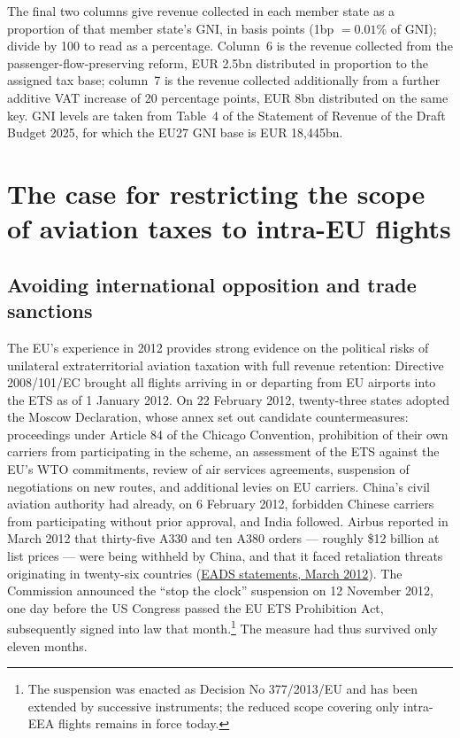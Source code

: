 \documentclass{article}
\begin{document}
\begin{table}[htbp]
\begin{minipage}{\textwidth}
The final two columns give revenue collected in each member state as a
proportion of that member state's GNI, in basis points (1bp $=0.01\%$ of GNI);
divide by 100 to read as a percentage. Column~6 is the revenue collected from
the passenger-flow-preserving reform, EUR 2.5bn distributed in proportion to
the assigned tax base; column~7 is the revenue collected additionally from a
further additive VAT increase of 20 percentage points, EUR 8bn distributed on
the same key. GNI levels are taken from Table~4 of the Statement of Revenue of
the Draft Budget 2025, for which the EU27 GNI base is EUR 18,445bn.
\end{minipage}
\end{table}


\section{The case for restricting the scope of aviation taxes to intra-EU flights }

\subsection{Avoiding international opposition and trade sanctions}

The EU's experience in 2012 provides strong evidence on the political risks of unilateral extraterritorial aviation taxation with full revenue retention:  Directive 2008/101/EC brought all flights arriving in or departing from EU airports into the ETS as of 1 January 2012. On 22 February 2012, twenty-three states adopted the Moscow Declaration, whose annex set out candidate countermeasures: proceedings under Article 84 of the Chicago Convention, prohibition of their own carriers from participating in the scheme, an assessment of the ETS against the EU's WTO commitments, review of air services agreements, suspension of negotiations on new routes, and additional levies on EU carriers. China's civil aviation authority had already, on 6 February 2012, forbidden Chinese carriers from participating without prior approval, and India followed. Airbus reported in March 2012 that thirty-five A330 and ten A380 orders --- roughly \$12 billion at list prices --- were being withheld by China, and that it faced retaliation threats originating in twenty-six countries (\href{https://www.aljazeera.com/economy/2012/3/9/eu-china-dispute-delaying-airbus-orders}{EADS statements, March 2012}). The Commission announced the ``stop the clock'' suspension on 12 November 2012, one day before the US Congress passed the EU ETS Prohibition Act, subsequently signed into law that month.\footnote{The suspension was enacted as Decision No 377/2013/EU and has been extended by successive instruments; the reduced scope covering only intra-EEA flights remains in force today. } The measure had thus survived only eleven months.
\end{document}

